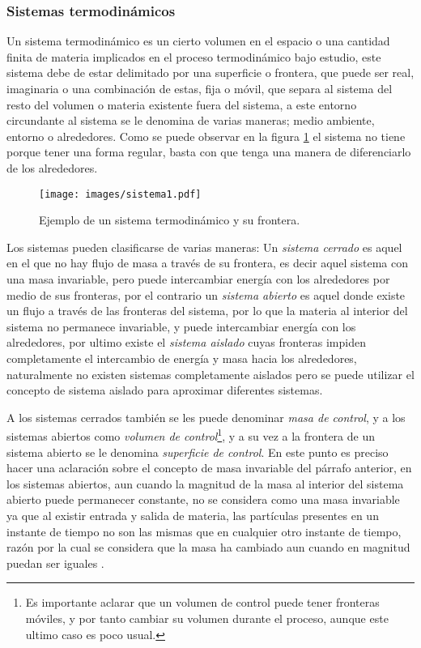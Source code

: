 \documentclass[../master.tex]{subfiles}
\begin{document}
\subsubsection{Sistemas termodinámicos}

Un sistema termodinámico es un cierto volumen en el espacio o una cantidad finita de materia implicados en el proceso termodinámico bajo estudio, este sistema debe de estar delimitado por una superficie o frontera, que puede ser real, imaginaria o una combinación de estas, fija o móvil, que separa al sistema del resto del volumen o materia existente fuera del sistema, a este entorno circundante al sistema se le denomina de varias maneras; medio ambiente, entorno o alrededores. Como se puede observar en la figura \ref{fig:exp_sistema} el sistema no tiene porque tener una forma regular, basta con que tenga una manera de diferenciarlo de los alrededores.

\begin{figure}[htbp]
    \centering
    \texttt{[image: images/sistema1.pdf]}
    \caption{Ejemplo de un sistema termodinámico y su frontera.}
    \label{fig:exp_sistema}
\end{figure}

Los sistemas pueden clasificarse de varias maneras: Un \emph{sistema cerrado} es aquel en el que no hay flujo de masa a través de su frontera, es decir aquel sistema con una masa invariable, pero puede intercambiar energía con los alrededores por medio de sus fronteras, por el contrario un \emph{sistema abierto} es aquel donde existe un flujo a través de las fronteras del sistema, por lo que la materia al interior del sistema no permanece invariable, y puede intercambiar energía con los alrededores, por ultimo existe el \emph{sistema aislado} cuyas fronteras impiden completamente el intercambio de energía y masa hacia los alrededores, naturalmente no existen sistemas completamente aislados pero se puede utilizar el concepto de sistema aislado para aproximar diferentes sistemas.

A los sistemas cerrados también se les puede denominar \emph{masa de control}, y a los sistemas abiertos como \emph{volumen de control}\footnote{Es importante aclarar que un volumen de control puede tener fronteras móviles, y por tanto cambiar su volumen durante el proceso, aunque este ultimo caso es poco usual.}, y a su vez a la frontera de un sistema abierto se le denomina \emph{superficie de control}. En este punto es preciso hacer una aclaración sobre el concepto de masa invariable del párrafo anterior, en los sistemas abiertos, aun cuando la magnitud de la masa al interior del sistema abierto puede permanecer constante, no se considera como una masa invariable ya que al existir entrada y salida de materia, las partículas presentes en un instante de tiempo no son las mismas que en cualquier otro instante de tiempo, razón por la cual se considera que la masa ha cambiado aun cuando en magnitud puedan ser iguales \parencites{clavell}{faires}{wark}.
\end{document}
